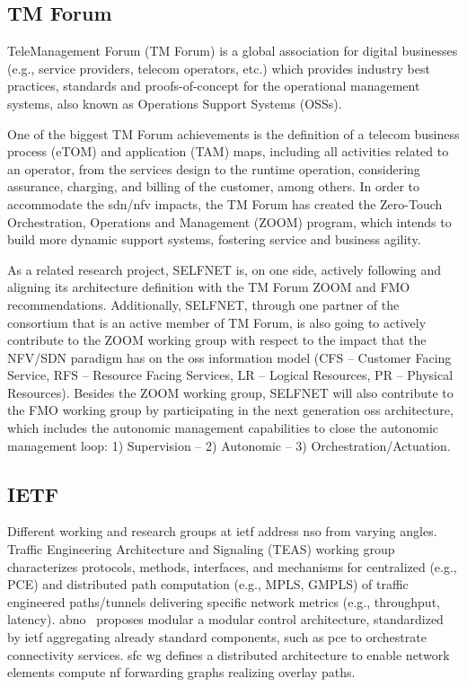 \subsection{TM Forum}
TeleManagement Forum (TM Forum) is a global association for
digital businesses (e.g., service providers, telecom operators, etc.) which provides industry best practices, standards and proofs-of-concept for the operational management systems, also known as Operations Support Systems (OSSs). 

One of the biggest TM Forum achievements is the definition of a telecom business process (eTOM) and application (TAM) maps, including all activities related to an operator, from the services design to the runtime operation, considering assurance, charging, and billing of the customer, among others. In order to accommodate the \gls{sdn}/\gls{nfv} impacts, the TM Forum has created the Zero-Touch Orchestration, Operations and Management (ZOOM) program, which intends to build more dynamic support systems, fostering service and business agility.

As a related research project, SELFNET is, on one side, actively following and aligning its architecture definition with the TM Forum ZOOM and FMO recommendations. Additionally, SELFNET, through one partner of the consortium that is an active member of TM Forum, is also going to actively contribute to the ZOOM working group with respect to the impact that the NFV/SDN paradigm has on the \gls{oss} information model (CFS – Customer Facing Service, RFS – Resource Facing Services, LR – Logical Resources, PR – Physical Resources). Besides the ZOOM working group, SELFNET will also contribute to the FMO working group by participating in the next generation \gls{oss} architecture, which includes the autonomic management capabilities to close the autonomic management loop: 1) Supervision – 2) Autonomic – 3) Orchestration/Actuation.

\subsection{IETF}
Different working and research groups at \gls{ietf} address \gls{nso} from varying angles. Traffic Engineering Architecture and Signaling (TEAS) working group characterizes protocols, methods, interfaces, and mechanisms for centralized (e.g., PCE) and distributed path computation (e.g., MPLS, GMPLS) of traffic engineered paths/tunnels delivering specific network metrics (e.g., throughput, latency).  
\gls{abno}~\cite{RFC7491} proposes modular a modular control architecture, standardized by \gls{ietf} aggregating already standard components, such as \gls{pce} to orchestrate connectivity services.  
\gls{sfc} \gls{wg} defines a distributed architecture to enable network elements compute \gls{nf} forwarding graphs realizing overlay paths.

